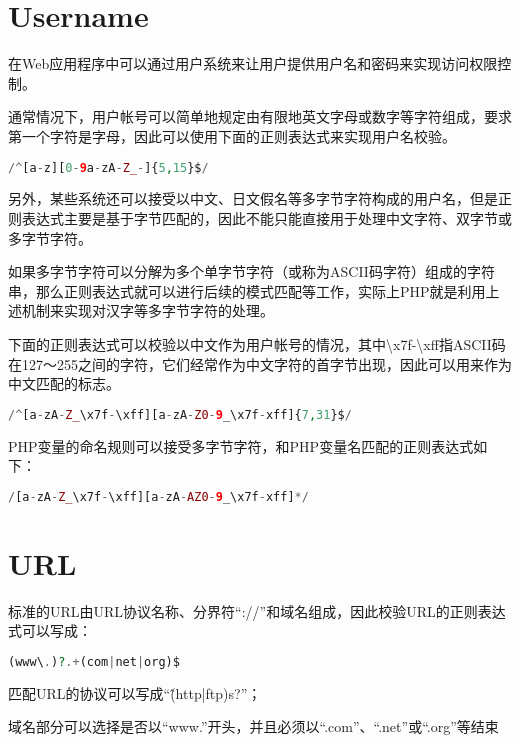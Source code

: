\chapter{Username}

在Web应用程序中可以通过用户系统来让用户提供用户名和密码来实现访问权限控制。

通常情况下，用户帐号可以简单地规定由有限地英文字母或数字等字符组成，要求第一个字符是字母，因此可以使用下面的正则表达式来实现用户名校验。


\begin{lstlisting}[language=PHP]
/^[a-z][0-9a-zA-Z_-]{5,15}$/
\end{lstlisting}

另外，某些系统还可以接受以中文、日文假名等多字节字符构成的用户名，但是正则表达式主要是基于字节匹配的，因此不能只能直接用于处理中文字符、双字节或多字节字符。

如果多字节字符可以分解为多个单字节字符（或称为ASCII码字符）组成的字符串，那么正则表达式就可以进行后续的模式匹配等工作，实际上PHP就是利用上述机制来实现对汉字等多字节字符的处理。

下面的正则表达式可以校验以中文作为用户帐号的情况，其中\textbackslash x7f-\textbackslash xff指ASCII码在127～255之间的字符，它们经常作为中文字符的首字节出现，因此可以用来作为中文匹配的标志。

\begin{lstlisting}[language=PHP]
/^[a-zA-Z_\x7f-\xff][a-zA-Z0-9_\x7f-xff]{7,31}$/
\end{lstlisting}

PHP变量的命名规则可以接受多字节字符，和PHP变量名匹配的正则表达式如下：

\begin{lstlisting}[language=PHP]
/[a-zA-Z_\x7f-\xff][a-zA-AZ0-9_\x7f-xff]*/
\end{lstlisting}


\chapter{URL}

标准的URL由URL协议名称、分界符“://”和域名组成，因此校验URL的正则表达式可以写成：

\begin{lstlisting}[language=PHP]
(www\.)?.+(com|net|org)$
\end{lstlisting}

\begin{compactitem}
\item 匹配URL的协议可以写成“\^(http|ftp)s?”；
\item 域名部分可以选择是否以“www.”开头，并且必须以“.com”、“.net”或“.org”等结束
\end{compactitem}

